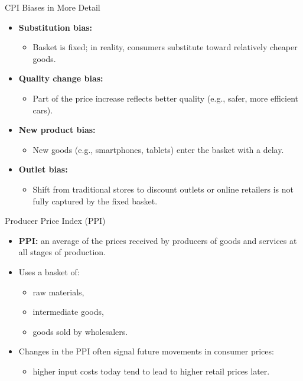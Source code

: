 \documentclass[aspectratio=169]{beamer}
\begin{document}
\begin{frame}{CPI Biases in More Detail}
\transfade
\begin{itemize}[<+->]
  \item \textbf{Substitution bias:}
  \begin{itemize}[<+->]
    \item Basket is fixed; in reality, consumers substitute toward relatively cheaper goods.
  \end{itemize}
  \item \textbf{Quality change bias:}
  \begin{itemize}[<+->]
    \item Part of the price increase reflects better quality (e.g., safer, more efficient cars).
  \end{itemize}
  \item \textbf{New product bias:}
  \begin{itemize}[<+->]
    \item New goods (e.g., smartphones, tablets) enter the basket with a delay.
  \end{itemize}
  \item \textbf{Outlet bias:}
  \begin{itemize}[<+->]
    \item Shift from traditional stores to discount outlets or online retailers is not fully captured by the fixed basket.
  \end{itemize}
\end{itemize}
\end{frame}

\begin{frame}{Producer Price Index (PPI)}
\transfade
\begin{itemize}[<+->]
  \item \textbf{PPI:} an average of the prices received by producers of goods and services at all stages of production.
  \item Uses a basket of:
  \begin{itemize}[<+->]
    \item raw materials,
    \item intermediate goods,
    \item goods sold by wholesalers.
  \end{itemize}
  \item Changes in the PPI often signal future movements in consumer prices:
  \begin{itemize}[<+->]
    \item higher input costs today tend to lead to higher retail prices later.
  \end{itemize}
\end{itemize}
\end{frame}
\end{document}
